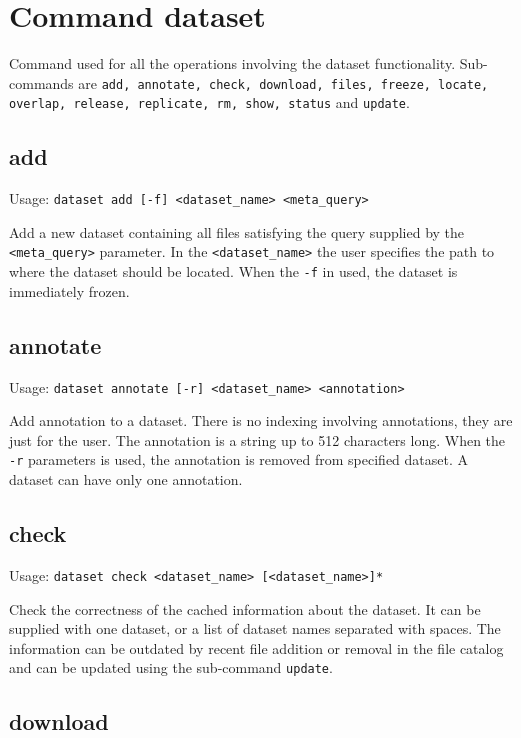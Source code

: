 \section{Command dataset}
Command used for all the operations involving the dataset
functionality. Sub-commands are \texttt{add, annotate, check,
download, files, freeze, locate, overlap, release, replicate, rm,
show, status} and \texttt{update}.

\subsection{add}

Usage: \texttt{dataset add [-f] <dataset\_name> <meta\_query>}

Add a new dataset containing all files satisfying the query
supplied by the \texttt{<meta\_query>} parameter. In the
\texttt{<dataset\_name>} the user specifies the path to where the
dataset should be located. When the \texttt{-f} in used, the
dataset is immediately frozen.

\subsection{annotate}

Usage: \texttt{dataset annotate [-r] <dataset\_name> <annotation>}

Add annotation to a dataset. There is no indexing involving
annotations, they are just for the user. The annotation is a string
up to 512 characters long. When the \texttt{-r} parameters is used,
the annotation is removed from specified dataset. A dataset can
have only one annotation.

\subsection{check}

Usage: \texttt{dataset check <dataset\_name> [<dataset\_name>]*}

Check the correctness of the cached information about the dataset.
It can be supplied with one dataset, or a list of dataset names
separated with spaces. The information can be outdated by recent
file addition or removal in the file catalog and can be updated
using the sub-command \texttt{update}.

\subsection{download}

